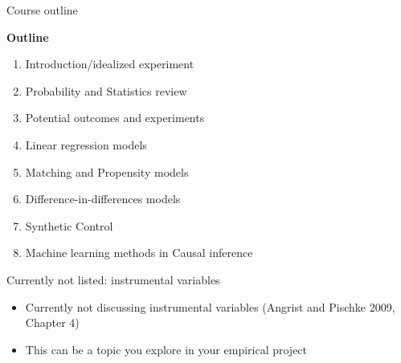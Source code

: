 \documentclass[handout, 8pt]{beamer}
\begin{document}
\begin{frame}{Course outline}

\textbf{Outline}
\begin{enumerate}
\item Introduction/idealized experiment


\item Probability and Statistics review

%
\item Potential outcomes and experiments


\item Linear regression models 

\item Matching and Propensity models

\item Difference-in-differences models

\item Synthetic Control

\item Machine learning methods in Causal inference

\end{enumerate}

\vspace{2ex}
Currently not listed: instrumental variables
\begin{itemize}
    \item Currently not discussing instrumental variables (Angrist and Pischke 2009, Chapter 4)
    \item This can be a topic you explore in your empirical project
\end{itemize}

\end{frame}
\end{document}

